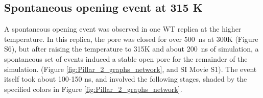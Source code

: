 \documentclass[journal=jacsat,manuscript=article]{achemso}
\newcommand{\SklowTrepTwo}{S6}
\newcommand{\SkMovie}{S1}
\newcommand{\GABAA}{GABA\textsubscript{A}R\xspace}
\newcommand{\plgics}{pLGICs}
\newcommand{\plgic}{pLGIC~}
\newcommand{\nachr}{nAChR~}
\newcommand{\WT}{WT\xspace}
\begin{document}

\subsection*{Spontaneous opening event at 315 K}
A spontaneous opening event was observed in one \WT replica at the higher temperature.  In this replica, the pore was closed for over 500~ns at 300K (Figure \SklowTrepTwo), but after raising the temperature to 315K and about 200~ns of simulation, a spontaneous set of events induced a stable open pore for the remainder of the simulation.  (Figure \ref{fig:Pillar_2_graphs_network}, and SI Movie \SkMovie).   The event itself took about 100-150 ns, and involved the following stages, shaded by the specified colors in Figure \ref{fig:Pillar_2_graphs_network}.
\end{document}
